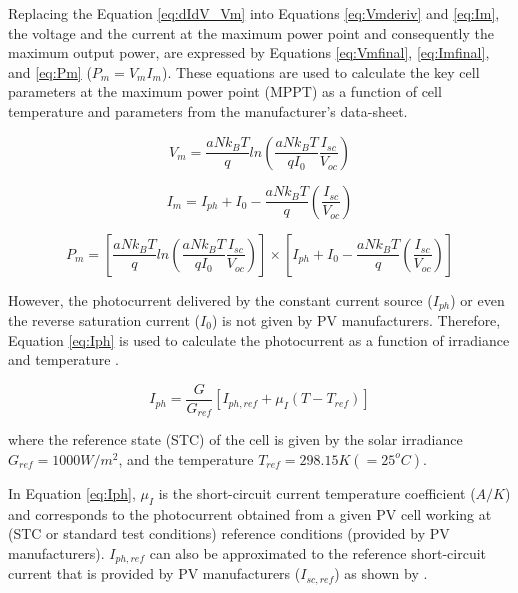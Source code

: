 Replacing the Equation \ref{eq:dIdV_Vm} into Equations \ref{eq:Vmderiv} and \ref{eq:Im}, the voltage and the current at the maximum power point and consequently the maximum output power, are expressed by Equations \ref{eq:Vmfinal}, \ref{eq:Imfinal}, and \ref{eq:Pm} ($ P_{m}=V_{m}I_{m} $). These equations are used to calculate the key cell parameters at the maximum power point (MPPT) as a function of cell temperature and parameters from the manufacturer's data-sheet.

\begin{equation}
\label{eq:Vmfinal}
V_{m}=\dfrac{aNk_{B}T}{q} ln \left( \dfrac{aNk_{B}T}{qI_{0}} \dfrac{I_{sc}}{V_{oc}}  \right) 
\end{equation}

\begin{equation}
\label{eq:Imfinal}
I_{m} = I_{ph} + I_{0} - \dfrac{aNk_{B}T}{q} \left( \dfrac{I_{sc}}{V_{oc}} \right)  
\end{equation}

\begin{equation}
\label{eq:Pm}
P_{m} = \left[ \dfrac{aNk_{B}T}{q} ln \left( \dfrac{aNk_{B}T}{qI_{0}} \dfrac{I_{sc}}{V_{oc}}  \right) \right] \times \left[ I_{ph} + I_{0} - \dfrac{aNk_{B}T}{q} \left( \dfrac{I_{sc}}{V_{oc}} \right)  \right] 
\end{equation}


However, the photocurrent delivered by the constant current source ($ I_{ph} $) or even the reverse saturation current ($ I_{0} $) is not given by PV manufacturers. Therefore, Equation \ref{eq:Iph} is used to calculate the photocurrent as a function of irradiance and temperature \cite{Villalva}.

\begin{equation}
\label{eq:Iph}
I_{ph}=\dfrac{G}{G_{ref}} \left[ I_{ph,ref} + \mu_{I} \left( T-T_{ref} \right)    \right] 
\end{equation}

\noindent where the reference state (STC) of the cell is given by the solar irradiance $ G_{ref}=1000 W/m^{2} $, and the temperature $ T_{ref}=298.15 K (=25^{o}C) $.

In Equation \ref{eq:Iph}, $ \mu_{I} $ is the short-circuit current temperature coefficient ($A/K$) and corresponds to the photocurrent obtained from a given PV cell working at (STC or standard test conditions) reference conditions (provided by PV manufacturers). $ I_{ph,ref} $ can also be approximated to the reference short-circuit current that is provided by PV manufacturers ($ I_{sc,ref} $) as shown by \cite{Jakhrani}.

